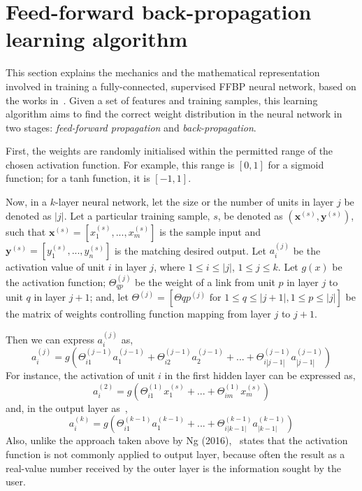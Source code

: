 \section{Feed-forward back-propagation learning algorithm}\label{sec:training}

This section explains the mechanics and the mathematical representation involved in training a fully-connected, supervised FFBP neural network, based on the works in~\cite{Ng12}. Given a set of features and training samples, this learning algorithm aims to find the correct weight distribution in the neural network in two stages: \textit{feed-forward propagation} and \textit{back-propagation}. 

First, the weights are randomly initialised within the permitted range of the chosen activation function. For example, this range is $[0,1]$ for a sigmoid function; for a tanh function, it is $[-1,1]$. 

Now, in a $k$-layer neural network, let the size or the number of units in layer $j$ be denoted as $|j|$. Let a particular training sample, $s$, be denoted as $(\boldsymbol{x}^{(s)},\boldsymbol{y}^{(s)})$, such that $\boldsymbol{x}^{(s)} = [x_1^{(s)},...,x_m^{(s)}]$ is the sample input and $\boldsymbol{y}^{(s)} = [y_1^{(s)},...,y_n^{(s)}]$ is the matching desired output. Let $a_{i}^{(j)}$ be the activation value of unit $i$ in layer $j$, where $1 \leq i \leq |j|$, $1 \leq j \leq k$. Let $g(x)$ be the activation function; $\Theta_{qp}^{(j)}$ be the weight of a link from unit $p$ in layer $j$ to unit $q$ in layer $j+1$; and, let $\Theta^{(j)}=[\Theta{qp}^{(j)} \text{ for } 1\leq q \leq |j+1|, 1 \leq p \leq |j|]$ be the matrix of weights controlling function mapping from layer $j$ to $j+1$.

Then we can express $a_{i}^{(j)}$ as,
\begin{equation}
a_{i}^{(j)} = g( \Theta_{i1}^{(j-1)}a_{1}^{(j-1)} + \Theta_{i2}^{(j-1)}a_{2}^{(j-1)} + ...+\Theta_{i|j-1|}^{(j-1)}a_{|j-1|}^{(j-1)} ) \label{eq:2.1}
\end{equation}
For instance, the activation of unit $i$ in the first hidden layer can be expressed as,
$$a_{i}^{(2)} = g(\Theta_{i1}^{(1)}x_{1}^{(s)} + ... + \Theta_{im}^{(1)}x_{m}^{(s)})$$
and, in the output layer as~\cite{Ng12},
$$a_{i}^{(k)} = g(\Theta_{i1}^{(k-1)}a_{1}^{(k-1)} + ...+\Theta_{i|k-1|}^{(k-1)}a_{|k-1|}^{(k-1)})$$ 
Also, unlike the approach taken above by Ng (2016),~\cite{Kar16} states that the activation function is not commonly applied to output layer, because often the result as a real-value number received by the outer layer is the information sought by the user.

